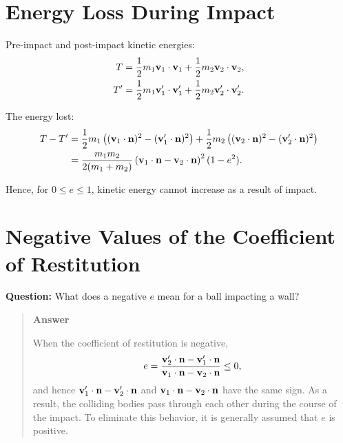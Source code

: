 \documentclass[
  letterpaper,
  DIV=11,
  numbers=noendperiod]{scrreprt}
\newcommand{\lp}{\left(}
\newcommand{\rp}{\right)}
\begin{document}
\section{Energy Loss During Impact}\label{energy-loss-during-impact}

Pre-impact and post-impact kinetic energies: \begin{align}
    T &= \frac{1}{2}m_1{\bf v}_1\cdot{\bf v}_1+\frac{1}{2}m_2{\bf v}_2\cdot{\bf v}_2,\\
    T' &= \frac{1}{2}m_1{\bf v}_1'\cdot{\bf v}_1'+\frac{1}{2}m_2{\bf v}_2'\cdot{\bf v}_2'.
\end{align}

The energy lost: \begin{align}
    \begin{split}
        T-T' &= \frac{1}{2}m_1\lp({\bf v}_1\cdot{\bf n})^2-({\bf v}_1'\cdot{\bf n})^2\rp+\frac{1}{2}m_2\lp({\bf v}_2\cdot{\bf n})^2-({\bf v}_2'\cdot{\bf n})^2\rp\\
        &= \frac{m_1 m_2}{2(m_1+m_2)}\lp{\bf v}_1\cdot{\bf n}-{\bf v}_2\cdot{\bf n}\rp^2(1-e^2).
    \end{split}
\end{align}

Hence, for \(0\leq e\leq 1\), kinetic energy cannot increase as a result
of impact.

\section{Negative Values of the Coefficient of
Restitution}\label{negative-values-of-the-coefficient-of-restitution}

\begin{tcolorbox}[enhanced jigsaw, arc=.35mm, bottomrule=.15mm, bottomtitle=1mm, breakable, colback=white, colbacktitle=quarto-callout-tip-color!10!white, colframe=quarto-callout-tip-color-frame, coltitle=black, left=2mm, leftrule=.75mm, opacityback=0, opacitybacktitle=0.6, rightrule=.15mm, title=\textcolor{quarto-callout-tip-color}{\faLightbulb}\hspace{0.5em}{Think!}, titlerule=0mm, toprule=.15mm, toptitle=1mm]

\textbf{Question:} What does a negative \(e\) mean for a ball impacting
a wall?

\begin{quote}
\textbf{Answer}

When the coefficient of restitution is negative, \begin{align}
    e = \frac{{\bf v}_2'\cdot{\bf n}-{\bf v}_1'\cdot{\bf n}}{{\bf v}_1\cdot{\bf n}-{\bf v}_2\cdot{\bf n}} \leq 0,
\end{align} and hence \({\bf v}_1'\cdot{\bf n}-{\bf v}_2'\cdot{\bf n}\)
and \({\bf v}_1\cdot{\bf n}-{\bf v}_2\cdot{\bf n}\) have the same sign.
As a result, the colliding bodies pass through each other during the
course of the impact. To eliminate this behavior, it is generally
assumed that \(e\) is positive.
\end{quote}

\end{tcolorbox}
\end{document}
